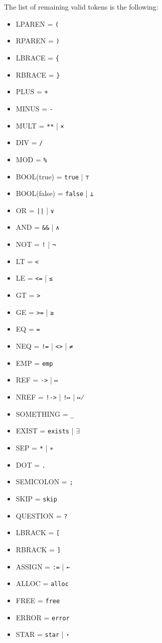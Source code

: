 \documentclass[parskip=half]{scrartcl}
\begin{document}
The list of remaining valid tokens is the following:
\begin{multicols}{3} %
\begin{itemize}
\item LPAREN = \texttt{(}
\item RPAREN = \texttt{)}
\item LBRACE = \texttt{\{}
\item RBRACE = \texttt{\}}
\item PLUS = \texttt{+}
\item MINUS = \texttt{-}
\item MULT = \texttt{**} | \texttt{×}
\item DIV = \texttt{/}
\item MOD = \texttt{\%}
\item BOOL(true) = \texttt{true} | \texttt{⊤}
\item BOOL(false) = \texttt{false} | \texttt{⊥}
\item OR = \texttt{||} | \texttt{∨}
\item AND = \texttt{\&\&} | \texttt{∧}
\item NOT = \texttt{!} | \texttt{¬}
\item LT = \texttt{<}
\item LE = \texttt{<=} | \texttt{≤}
\item GT = \texttt{>}
\item GE = \texttt{>=} | \texttt{≥}
\item EQ = \texttt{=}
\item NEQ = \texttt{!=} | \texttt{<>} | \texttt{≠}
\item EMP = \texttt{emp}
\item REF = \texttt{->} | \texttt{↦}
\item NREF = \texttt{!->} | \texttt{!↦} | \texttt{↦̸}
\item SOMETHING = \texttt{\_}
\item EXIST = \texttt{exists} | $\exists$
\item SEP = \texttt{*} | \texttt{∗}
\item DOT = \texttt{.}
\item SEMICOLON = \texttt{;}
\item SKIP = \texttt{skip}
\item QUESTION = \texttt{?}
\item LBRACK = \texttt{[}
\item RBRACK = \texttt{]}
\item ASSIGN = \texttt{:=} | \texttt{←}
\item ALLOC = \texttt{alloc}
\item FREE = \texttt{free}
\item ERROR = \texttt{error}
\item STAR = \texttt{star} | \texttt{⋆}
\end{itemize}
\end{multicols}
\end{document}
